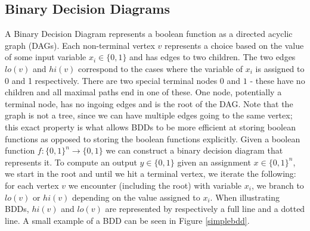\documentclass[../master/master.tex]{subfiles}
\begin{document}
\subsection{Binary Decision Diagrams}
A Binary Decision Diagram represents a boolean function as a directed acyclic graph (DAGs). Each non-terminal vertex $v$ represents a choice based on the value of some input variable $x_i\in \{0,1\}$ and has edges to two children. The two edges $lo(v)$ and $hi(v)$ correspond to the cases where the variable of $x_i$ is assigned to 0 and 1 respectively. There are two special terminal nodes $0$ and $1$ - these have no children and all maximal paths end in one of these. One node, potentially a terminal node, has no ingoing edges and is the root of the DAG. Note that the graph is not a tree, since we can have multiple edges going to the same vertex; this exact property is what allows BDDs to be more efficient at storing boolean functions as opposed to storing the boolean functions explicitly.
Given a boolean function $f: \{0,1\}^n \rightarrow \{0,1\}$ we can construct a binary decision diagram that represents it. To compute an output $y\in \{0,1\}$ given an assignment  $x\in\{0,1\}^n$, we start in the root and until we hit a terminal vertex, we iterate the following: for each vertex $v$ we encounter (including the root) with variable $x_i$, we branch to $lo(v)$ or $hi(v)$ depending on the value assigned to $x_i$. When illustrating BDDs, $hi(v)$ and $lo(v)$ are represented by respectively a full line and a dotted line. A small example of a BDD can be seen in Figure \ref{simplebdd}.
\end{document}
